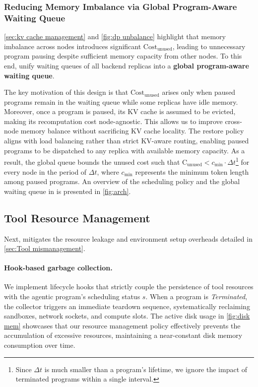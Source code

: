 \subsubsection{Reducing Memory Imbalance via Global Program-Aware Waiting Queue}
\autoref{sec:kv cache management} and \autoref{fig:dp unbalance} highlight that memory imbalance across nodes introduces significant $\text{Cost}_{\text{unused}}$, leading to unnecessary program pausing despite sufficient memory capacity from other nodes. To this end, \ouralg unify waiting queues of all backend replicas into a \textbf{global program-aware waiting queue}.

The key motivation of this design is that $\text{Cost}_{\text{unused}}$ arises only
when paused programs remain in the waiting queue while some replicas
have idle memory. Moreover, once a program is paused, its KV cache is
assumed to be evicted, making its recomputation cost node-agnostic. This allows us to improve cross-node memory balance without sacrificing KV cache locality. The restore policy aligns with load balancing rather than strict KV-aware routing, enabling paused programs to be dispatched to any
replica with available memory capacity. As a result, the global queue bounds the unused cost such that $\text{C}_{\text{unused}} < c_{\mathrm{min}} \cdot \Delta t$\footnote{Since $\Delta t$ is much smaller than a program’s lifetime, we ignore the impact of terminated programs within a single interval.} for every node in the period of $\Delta t$, where $c_{\mathrm{min}}$ represents the minimum token length among paused programs. An overview of the scheduling policy and the global waiting queue in \ouralg is presented in \autoref{fig:arch}.

\subsection{Tool Resource Management}
\label{sec:tool_resource}
Next, \ouralg mitigates the resource leakage and environment setup overheads detailed in \autoref{sec:Tool mismanagement}.
\paragraph{Hook-based garbage collection.} We implement lifecycle hooks that strictly couple the persistence of tool resources with the agentic program's scheduling status $s$. When a program is \textit{Terminated}, the collector triggers an immediate teardown sequence, systematically reclaiming sandboxes, network sockets, and compute slots. The active disk usage in \autoref{fig:disk mem} showcases that our resource management policy effectively prevents the accumulation of excessive resources, maintaining a near-constant disk memory consumption over time.


